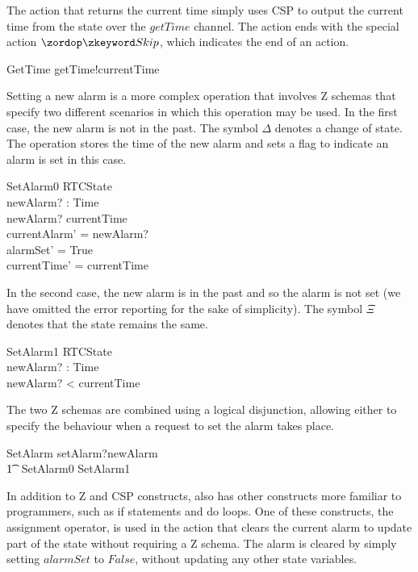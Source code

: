 \documentclass[a4paper,10pt]{report}
\begin{document}
%
The action that returns the current time simply uses CSP to output the current
time from the state over the $getTime$ channel. The action ends with the special
action $\Skip$, which indicates the end of an action.
%
\begin{circusaction}
  GetTime \circdef getTime!currentTime \then \Skip
\end{circusaction}
%
Setting a new alarm is a more complex operation that involves Z schemas that
specify two different scenarios in which this operation may be used. In the
first case, the new alarm is not in the past. The symbol $\Delta$ denotes a
change of state. The operation stores the time of the new alarm and sets a flag
to indicate an alarm is set in this case.
%
\begin{schema}{SetAlarm0}
  \Delta RTCState \\
  newAlarm? : Time \\
\where
  newAlarm? \geq currentTime \\
  currentAlarm' = newAlarm? \\
  alarmSet' = True \\
  currentTime' = currentTime \\
\end{schema}
%
In the second case, the new alarm is in the past and so the alarm is not set (we
have omitted the error reporting for the sake of simplicity). The symbol $\Xi$
denotes that the state remains the same.
%
\begin{schema}{SetAlarm1}
  \Xi RTCState \\
  newAlarm? : Time \\
\where
  newAlarm? < currentTime \\
\end{schema}
%
The two Z schemas are combined using a logical disjunction, allowing either to
specify the behaviour when a request to set the alarm takes place.
%
\begin{circusaction}
  SetAlarm \circdef setAlarm?newAlarm \\
  \t1 \then\ \lschexpract SetAlarm0 \lor SetAlarm1 \rschexpract
\end{circusaction}
%
In addition to Z and CSP constructs, \Circus{} also has other constructs more
familiar to programmers, such as if statements and do loops. One of these
constructs, the assignment operator, is used in the action that clears the
current alarm to update part of the state without requiring a Z schema.  The
alarm is cleared by simply setting $alarmSet$ to $False$, without updating any
other state variables.
\end{document}
